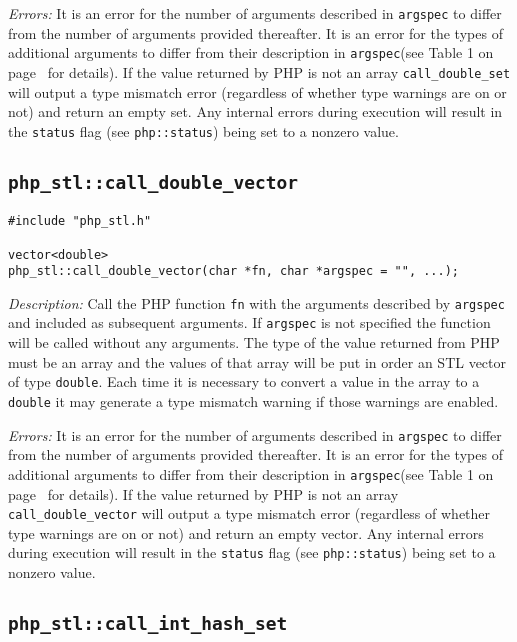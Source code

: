 \documentclass[11pt,titlepage]{article}
\begin{document}
\emph{Errors:} It is an error for the number of arguments described in \verb|argspec| to differ from the number of arguments provided thereafter. It is an error for the types of additional arguments to differ from their description in \verb|argspec|(see Table 1 on page~\pageref{Table1} for details). If the value returned by PHP is not an array \verb|call_double_set| will output a type mismatch error (regardless of whether type warnings are on or not) and return an empty set. Any internal errors during execution will result in the \verb|status| flag (see \verb|php::status|) being set to a nonzero value.


\subsection{\texttt{php\_stl::call\_double\_vector}}

\begin{verbatim}
#include "php_stl.h"

vector<double> 
php_stl::call_double_vector(char *fn, char *argspec = "", ...);
\end{verbatim}

\emph{Description:} Call the PHP function \verb|fn| with the arguments described by \verb|argspec| and included as subsequent arguments. If \verb|argspec| is not specified the function will be called without any arguments. The type of the value returned from PHP must be an array and the values of that array will be put in order an STL vector of type \verb|double|. Each time it is necessary to convert a value in the array to a \verb|double| it may generate a type mismatch warning if those warnings are enabled.

\emph{Errors:} It is an error for the number of arguments described in \verb|argspec| to differ from the number of arguments provided thereafter. It is an error for the types of additional arguments to differ from their description in \verb|argspec|(see Table 1 on page~\pageref{Table1} for details). If the value returned by PHP is not an array \verb|call_double_vector| will output a type mismatch error (regardless of whether type warnings are on or not) and return an empty vector. Any internal errors during execution will result in the \verb|status| flag (see \verb|php::status|) being set to a nonzero value.


\subsection{\texttt{php\_stl::call\_int\_hash\_set}}
\end{document}
